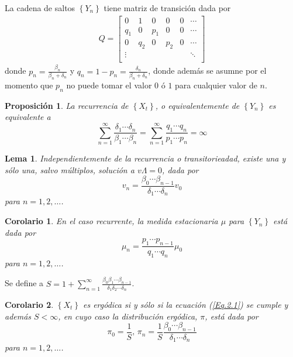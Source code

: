 \documentclass{article}
\newtheorem{Prop}{Proposición}
\newtheorem{Cor}{Corolario}
\newtheorem{Lema}{Lema}
\begin{document}
La cadena de saltos $\left\{Y_{n}\right\}$ tiene matriz de transici\'on dada por
\begin{eqnarray*}
Q=\left[\begin{array}{cccccc}
0 & 1 & 0 &0 &0& \cdots\\
q_{1} & 0 & p_{1} & 0 & 0 &\cdots\\
0 & q_{2} & 0 & p_{2} & 0 &\cdots\\
\vdots & & & & & \ddots\\
\end{array}\right]
\end{eqnarray*}
donde $p_{n}=\frac{\beta_{n}}{\beta_{n}+\delta_{n}}$ y $q_{n}=1-p_{n}=\frac{\delta_{n}}{\beta_{n}+\delta_{n}}$, donde adem\'as se asumne por el momento que $p_{n}$ no puede tomar el valor $0$ \'o $1$ para cualquier valor de $n$.

\begin{Prop}\label{Prop.2.1}
La recurrencia de $\left\{X_{t}\right\}$, o equivalentemente de $\left\{Y_{n}\right\}$ es equivalente a
\begin{equation}\label{Eq.2.1}
\sum_{n=1}^{\infty}\frac{\delta_{1}\cdots\delta_{n}}{\beta_{1}\cdots\beta_{n}}=\sum_{n=1}^{\infty}\frac{q_{1}\cdots q_{n}}{p_{1}\cdots p_{n}}=\infty
\end{equation}
\end{Prop}

\begin{Lema}\label{Lema.2.2}
Independientemente de la recurrencia o transitorieadad, existe una y s\'olo una, salvo m\'ultiplos, soluci\'on a $v\Lambda=0$, dada por
\begin{equation}\label{Eq.2.2}
v_{n}=\frac{\beta_{0}\cdots\beta_{n-1}}{\delta_{1}\cdots\delta_{n}}v_{0}
\end{equation}
para $n=1,2,\ldots$.
\end{Lema}

\begin{Cor}\label{Cor.2.3}
En el caso recurrente, la medida estacionaria $\mu$ para $\left\{Y_{n}\right\}$ est\'a dada por
\begin{equation}\label{Eq.}
\mu_{n}=\frac{p_{1}\cdots p_{n-1}}{q_{1}\cdots q_{n}}\mu_{0}
\end{equation}
para $n=1,2,\ldots$.
\end{Cor}

Se define a $S=1+\sum_{n=1}^{\infty}\frac{\beta_{0}\beta_{1}\cdots\beta_{n-1}}{\delta_{1}\delta_{2}\cdots\delta_{n}}$.

\begin{Cor}\label{Cor.2.4}
$\left\{X_{t}\right\}$ es erg\'odica si y s\'olo si la ecuaci\'on (\ref{Eq.2.1}) se cumple y adem\'as $S<\infty$, en cuyo caso la distribuci\'on erg\'odica, $\pi$, est\'a dada por
\begin{equation}\label{Eq.2.4}
\pi_{0}=\frac{1}{S}\textrm{,     }\pi_{n}=\frac{1}{S}\frac{\beta_{0}\cdots\beta_{n-1}}{\delta_{1}\cdots\delta_{n}}
\end{equation}
para $n=1,2,\ldots$.
\end{Cor}
\end{document}
